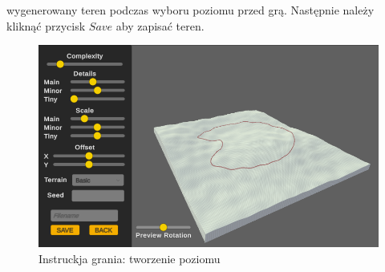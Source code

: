     wygenerowany teren podczas wyboru poziomu przed grą. Następnie należy kliknąć przycisk $Save$ aby zapisać teren.
    \begin{figure}[H]
        \centering
        \includegraphics[width=.7\textwidth]{figures/game_instruction_create.png}
        \caption{Instruckja grania: tworzenie poziomu}
        \label{fig}
    \end{figure}